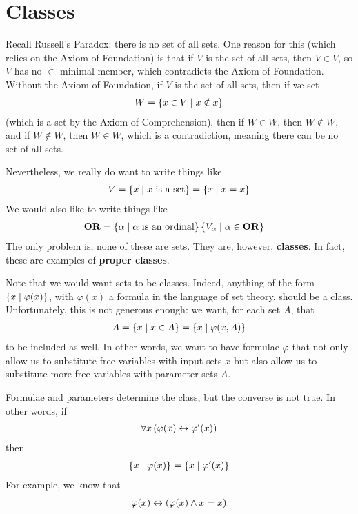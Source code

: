 \section{Classes}

Recall Russell's Paradox: there is no set of all sets. One reason for this (which relies on the Axiom of Foundation) is that if $V$ is the set of all sets, then $V \in V$, so $V$ has no $\in$-minimal member, which contradicts the Axiom of Foundation. Without the Axiom of Foundation, if $V$ is the set of all sets, then if we set
\begin{align*}
    W = \left\{ x \in V \; \middle\vert \; x \notin x \right\}
\end{align*}
(which is a set by the Axiom of Comprehension), then if $W \in W$, then $W \notin W$, and if $W \notin W$, then $W \in W$, which is a contradiction, meaning there can be no set of all sets.

Nevertheless, we really do want to write things like
\begin{align*}
    V = \left\{ x \; \middle\vert \; x \text{ is a set} \right\} = \left\{ x \; \middle\vert \; x = x \right\}
\end{align*}
We would also like to write things like
\begin{align*}
    \mathbf{OR} &= \left\{ \alpha \; \middle\vert \; \alpha \text{ is an ordinal} \right\} 
    \left\{ V_{\alpha} \; \middle\vert \; \alpha \in \mathbf{OR} \right\}
\end{align*}
The only problem is, none of these are sets. They are, however, \textbf{classes}. In fact, these are examples of \textbf{proper classes}.

Note that we would want sets to be classes. Indeed, anything of the form $\left\{ x \; \middle\vert \; \varphi(x) \right\}$, with $\varphi(x)$ a formula in the language of set theory, should be a class. Unfortunately, this is not generous enough: we want, for each set $A$, that
\begin{align*}
    A = \left\{ x \; \middle\vert \; x \in A \right\} = \left\{ x \; \middle\vert \; \varphi\!\left( x, A \right) \right\}
\end{align*}
to be included as well. In other words, we want to have formulae $\varphi$ that not only allow us to substitute free variables with input sets $x$ but also allow us to substitute more free variables with parameter sets $A$.

Formulae and parameters determine the class, but the converse is not true. In other words, if
\begin{align*}
    \forall x \left( \varphi(x) \leftrightarrow \varphi'(x) \right)
\end{align*}
then
\begin{align*}
    \left\{ x \; \middle\vert \; \varphi(x) \right\} = \left\{ x \; \middle\vert \; \varphi'(x) \right\}
\end{align*}
For example, we know that
\begin{align*}
    \varphi(x) \leftrightarrow \left( \varphi(x) \land x = x \right)
\end{align*}